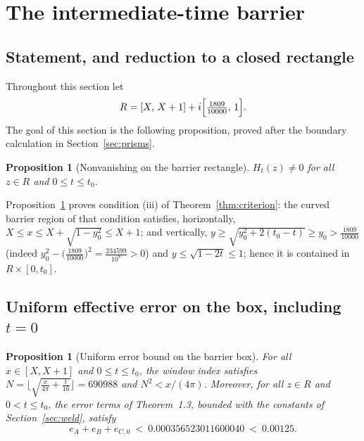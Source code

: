 \documentclass[11pt]{article}
\newtheorem{proposition}[theorem]{Proposition}
\theoremstyle{definition}
\begin{document}
\section{The intermediate-time barrier}\label{sec:barrier}

\subsection{Statement, and reduction to a closed rectangle}

Throughout this section let
\[
R=[X,\,X+1]+i\Bigl[\tfrac{1809}{10000},\,1\Bigr].
\]
The goal of this section is the following proposition, proved after the
boundary calculation in Section~\ref{sec:prisms}.

\begin{proposition}[Nonvanishing on the barrier rectangle]\label{thm:barrier}
$H_t(z)\ne0$ for all $z\in R$ and $0\le t\le t_0$.
\end{proposition}

Proposition~\ref{thm:barrier} proves condition (iii) of
Theorem~\ref{thm:criterion}: the curved barrier region of that
condition satisfies, horizontally,
$X\le x\le X+\sqrt{1-y_0^2}\le X+1$; and vertically,
$y\ge\sqrt{y_0^2+2(t_0-t)}\ge y_0>\frac{1809}{10000}$ (indeed
$y_0^2-\bigl(\frac{1809}{10000}\bigr)^2=\frac{234599}{10^8}>0$) and
$y\le\sqrt{1-2t}\le1$; hence it is contained in $R\times[0,t_0]$.

\subsection{Uniform effective error on the box, including
\texorpdfstring{$t=0$}{t=0}}
\label{sec:barriererr}

\begin{proposition}[Uniform error bound on the barrier box]\label{prop:barriererr}
For all $x\in[X,X+1]$ and $0\le t\le t_0$, the window index satisfies
$N=\bigl\lfloor\sqrt{\frac{x}{4\pi}+\frac t{16}}\bigr\rfloor=690988$
and $N^2<x/(4\pi)$. Moreover, for all $z\in R$ and $0<t\le t_0$, the
error terms of Theorem~1.3, bounded with the constants of
Section~\ref{sec:weld}, satisfy
\begin{equation}\label{eq:barriererror}
e_A+e_B+e_{C,0}\ <\ 0.000356523011600040\ <\ 0.00125 .
\end{equation}
\end{proposition}
\end{document}
